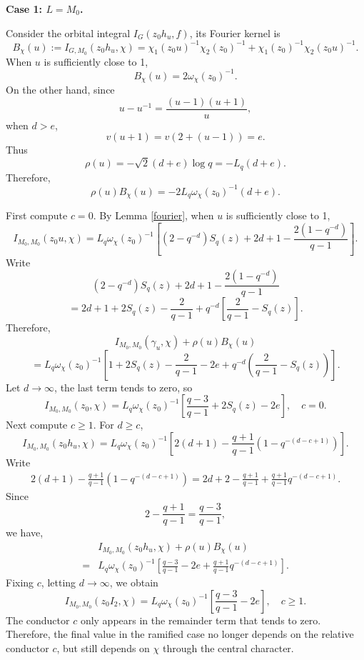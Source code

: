 \documentclass[11pt]{amsart}
\theoremstyle{definition}
\numberwithin{equation}{section}
\begin{document}
	
	\textbf{Case 1: $L=M_0$.}
	
	
	Consider the orbital integral \(I_G(z_0h_u,f)\), its Fourier kernel is 
	\[B_\chi(u) := I_{G,M_0}(z_0h_u, \chi) = \chi_1(z_0u)^{-1}\chi_2(z_0)^{-1} + \chi_1(z_0)^{-1}\chi_2(z_0u)^{-1}.\]
	When \(u\) is sufficiently close to 1,
	\[
	B_\chi(u) = 2\omega_\chi(z_0)^{-1}.
	\]
	On the other hand, since
	\[
	u - u^{-1} = \frac{(u-1)(u+1)}{u},
	\]
	when \(d > e\),
	\[
	v(u+1) = v(2 + (u-1)) = e.
	\]
	Thus
	\[
	\rho(u) = -\sqrt{2}(d+e)\log q = -L_q(d+e).
	\]
	Therefore, 
	\[
	\rho(u)B_\chi(u) = -2L_q\omega_\chi(z_0)^{-1}(d+e).
	\]
	
	
	First compute \(c=0\). By Lemma \ref{fourier}, when \(u\) is sufficiently close to 1,
	\[
	I_{M_0,M_0}(z_0u, \chi) = L_q \omega_\chi(z_0)^{-1} \left[ (2 - q^{-d})S_q(z) + 2d + 1 - \frac{2(1 - q^{-d})}{q-1} \right].
	\]
	Write
	\[
	(2 - q^{-d})S_q(z) + 2d + 1 - \frac{2(1-q^{-d})}{q-1}
	\]
	\[
	= 2d + 1 + 2S_q(z) - \frac{2}{q-1} + q^{-d} \left[ \frac{2}{q-1} - S_q(z) \right].
	\]
	Therefore,
	\[
	I_{M_0,M_0}(\gamma_u, \chi) + \rho(u)B_\chi(u)
	\]
	\[
	= L_q \omega_\chi(z_0)^{-1} \left[ 1 + 2S_q(z) - \frac{2}{q-1} - 2e + q^{-d} \left( \frac{2}{q-1} - S_q(z) \right) \right].
	\]
	Let \(d \to \infty\), the last term tends to zero, so
	\[
	I_{M_0,M_0}(z_0, \chi) = L_q \omega_\chi(z_0)^{-1} \left[ \frac{q-3}{q-1} + 2S_q(z) - 2e \right], \quad c=0.
	\]
	Next compute \(c \ge 1\). For \(d\ge c\),
	\[
	I_{M_0,M_0}(z_0h_u, \chi) = L_q \omega_\chi(z_0)^{-1} \left[ 2(d+1) - \frac{q+1}{q-1} \left( 1 - q^{-(d-c+1)} \right) \right].
	\]
	Write
	\begin{align*}
		2(d+1) - \frac{q+1}{q-1} \left( 1 - q^{-(d-c+1)} \right)=2d + 2 - \frac{q+1}{q-1} + \frac{q+1}{q-1} q^{-(d-c+1)}.
	\end{align*}
	Since
	\[
	2 - \frac{q+1}{q-1} = \frac{q-3}{q-1},
	\]
	we have,
	\begin{align*}
		&I_{M_0,M_0}(z_0h_u, \chi) + \rho(u)B_\chi(u)\\
		=&L_q \omega_\chi(z_0)^{-1} \left[ \frac{q-3}{q-1} - 2e + \frac{q+1}{q-1} q^{-(d-c+1)} \right].
	\end{align*}
	Fixing \(c\), letting \(d \to \infty\), we obtain
	\[
	I_{M_0,M_0}(z_0I_2, \chi) = L_q \omega_\chi(z_0)^{-1} \left[ \frac{q-3}{q-1} - 2e \right], \quad c \ge 1.
	\]
	The conductor \(c\) only appears in the remainder term that tends to zero. Therefore, the final value in the ramified case no longer depends on the relative conductor \(c\), but still depends on \(\chi\) through the central character.
	
\end{document}
